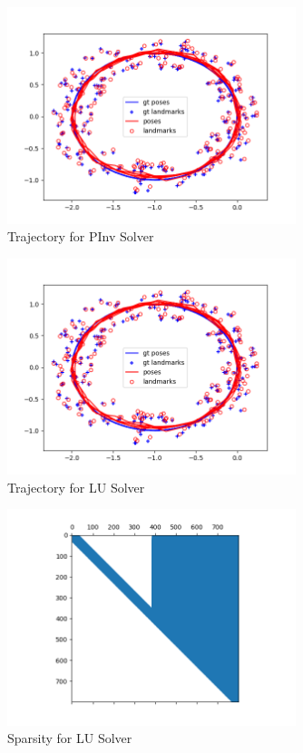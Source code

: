 \documentclass[12pt, a4paper]{article}
\begin{document}
\begin{figure}
    \center
    \includegraphics[width=0.75\textwidth]{linear_loop_results/loop_pinv.png}
    \caption{Trajectory for PInv Solver}
\end{figure}

\begin{figure}
    \center
    \includegraphics[width=0.75\textwidth]{linear_loop_results/loop_lu.png}
    \caption{Trajectory for LU Solver}
\end{figure}

\begin{figure}
    \center
    \includegraphics[width=0.75\textwidth]{linear_loop_results/lu_sparsity_loop.png}
    \caption{Sparsity for LU Solver}
\end{figure}
\end{document}
